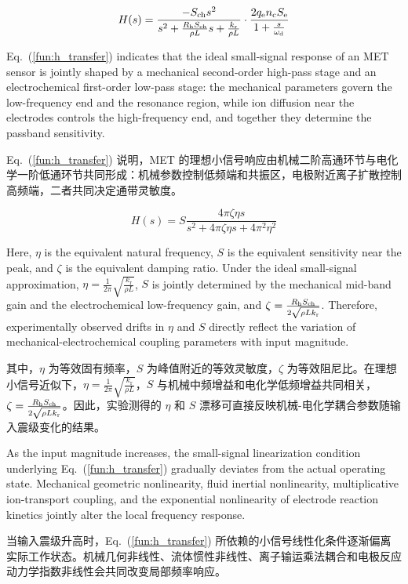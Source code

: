 \documentclass[sn-nature]{sn-jnl}
\newif\ifCNENEnglish
\newif\ifCNENBilingual
\newcommand{\CNEN}[2]{%
    \ifCNENBilingual
        #1%
        \if\relax\detokenize{#2}\relax\else\par #2\fi%
    \else
        \ifCNENEnglish
            #2%
        \else
            #1%
        \fi
    \fi
}
\newcommand{\fn}{\eta} %
\newcommand{\Sen}{S} %
\newcommand{\kr}{k_{\text{r}}} %
\begin{document}
\begin{equation}
    H(s) = \frac{- S_{\rm ch} s^2}{s^2 + \frac{R_{\text{h}} S_{\rm ch}}{\rho L}s + \frac{\kr}{\rho L }}
    \cdot
    \frac{2 q_{\rm e} n_{\rm c} S_{\rm e}}{1 + \frac{s}{\omega_{\rm d}}}
    \label{fun:h_transfer}
\end{equation}

\CNEN{Eq.~(\ref{fun:h_transfer}) 说明，MET 的理想小信号响应由机械二阶高通环节与电化学一阶低通环节共同形成：机械参数控制低频端和共振区，电极附近离子扩散控制高频端，二者共同决定通带灵敏度。}{Eq.~(\ref{fun:h_transfer}) indicates that the ideal small-signal response of an MET sensor is jointly shaped by a mechanical second-order high-pass stage and an electrochemical first-order low-pass stage: the mechanical parameters govern the low-frequency end and the resonance region, while ion diffusion near the electrodes controls the high-frequency end, and together they determine the passband sensitivity.%
}

\begin{equation}
    H(s) = \Sen \frac{4\pi \zeta \fn s}{s^2 + 4\pi \zeta \fn s + 4\pi^2 \fn^2}
    \label{fun:theFittingFormatOfWs_modified}
\end{equation}

\CNEN{其中，$\fn$ 为等效固有频率，$\Sen$ 为峰值附近的等效灵敏度，$\zeta$ 为等效阻尼比。在理想小信号近似下，$\fn = \frac{1}{2\pi} \sqrt{\frac{\kr}{\rho L}}$，$\Sen$ 与机械中频增益和电化学低频增益共同相关，$\zeta = \frac{R_{\text{h}} S_{\rm ch}}{2 \sqrt{\rho L \kr}}$。因此，实验测得的 $\fn$ 和 $\Sen$ 漂移可直接反映机械-电化学耦合参数随输入震级变化的结果。}{Here, $\fn$ is the equivalent natural frequency, $\Sen$ is the equivalent sensitivity near the peak, and $\zeta$ is the equivalent damping ratio. Under the ideal small-signal approximation, $\fn = \frac{1}{2\pi} \sqrt{\frac{\kr}{\rho L}}$, $\Sen$ is jointly determined by the mechanical mid-band gain and the electrochemical low-frequency gain, and $\zeta = \frac{R_{\text{h}} S_{\rm ch}}{2 \sqrt{\rho L \kr}}$. Therefore, experimentally observed drifts in $\fn$ and $\Sen$ directly reflect the variation of mechanical-electrochemical coupling parameters with input magnitude.%
}

\CNEN{当输入震级升高时，Eq.~(\ref{fun:h_transfer}) 所依赖的小信号线性化条件逐渐偏离实际工作状态。机械几何非线性、流体惯性非线性、离子输运乘法耦合和电极反应动力学指数非线性会共同改变局部频率响应。}{As the input magnitude increases, the small-signal linearization condition underlying Eq.~(\ref{fun:h_transfer}) gradually deviates from the actual operating state. Mechanical geometric nonlinearity, fluid inertial nonlinearity, multiplicative ion-transport coupling, and the exponential nonlinearity of electrode reaction kinetics jointly alter the local frequency response.%
}
\end{document}

